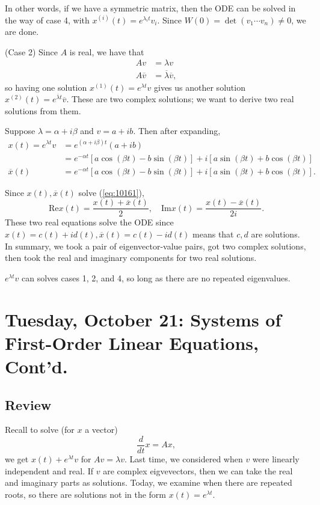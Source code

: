 \documentclass{tufte-handout}
\theoremstyle{definition}
\begin{document}
In other words, if we have a symmetric matrix, then the ODE can be solved in the way of case 4, with $x^{(i)}(t) = e^{\lambda_i t}v_i$. 
Since $W(0) = \det(v_1 \cdots v_n) \ne 0$, we are done.

(Case 2) Since $A$ is real, we have that
\begin{align*}
	Av &= \lambda v \\
	A \overline{v} &= \overline{\lambda} \overline{v}
,\end{align*} 
so having one solution $x^{(1)}(t) = e^{\lambda t} v$ gives us another solution $x^{(2)}(t) = e^{\overline{\lambda} t} \overline{v}$. These are two complex solutions; we want to derive two real solutions from them.

Suppose $\lambda = \alpha + i \beta$ and $v = a + ib$. 
Then after expanding,
\begin{align*}
	x(t) = e^{\lambda t} v &= e^{\left( \alpha + i \beta \right)t} (a + ib) \\
					&= e^{-\alpha t} \left[ a \cos{(\beta t)} - b \sin{(\beta t)} \right]  + i \left[ a \sin{(\beta t)} + b \cos{(\beta t)} \right] \\
	\overline{x}(t) &= e^{-\alpha t} \left[ a \cos{(\beta t)} - b \sin{(\beta t)} \right]  + i \left[ a \sin{(\beta t)} + b \cos{(\beta t)} \right] 
.\end{align*}

Since $x(t), \overline{x}(t)$ solve (\ref{eq:10161}), \[
	\text{Re} x(t) = \frac{x\left(t \right) + \overline{x}(t)}{2}, \quad \text{Im} x(t) = \frac{x(t) - \overline{x}(t)}{2i}
.\] These two real equations solve the ODE since $x(t) = c(t) + i d\left(t \right), \overline{x}(t) = c(t) - i d(t)$ means that $c,d$ are solutions.
In summary, we took a pair of eigenvector-value pairs, got two complex solutions, then took the real and imaginary components for two real solutions. 

$e^{\lambda t}v$ can solves cases 1, 2, and 4, so long as there are no repeated eigenvalues.

\section{Tuesday, October 21: Systems of First-Order Linear Equations, Cont'd.}
\subsection{Review}
Recall to solve (for $x$ a vector) \[
	\frac{d}{dt}x = A x
,\] we get $x(t) + e^{\lambda t} v$ for $Av = \lambda v$. 
Last time, we considered when $v$ were linearly independent and real. If $v$ are complex eigvevectors, then we can take the real and imaginary parts as solutions. Today, we examine when there are repeated roots, so there are solutions not in the form $x(t) = e^{\lambda t}$.
\end{document}
